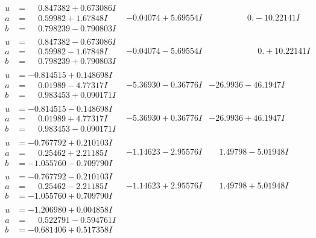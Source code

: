 \documentclass[1p]{elsarticle_modified}
\theoremstyle{definition}
\begin{document}
$$\begin{array}{c|c|c}
\begin{aligned}
u &= \phantom{-}0.847382 + 0.673086 I \\
a &= \phantom{-}0.59982 + 1.67848 I \\
b &= \phantom{-}0.798239 - 0.790803 I\end{aligned}
 & -0.04074 + 5.69554 I & \phantom{-0.000000 } 0. - 10.22141 I \\ \hline\begin{aligned}
u &= \phantom{-}0.847382 - 0.673086 I \\
a &= \phantom{-}0.59982 - 1.67848 I \\
b &= \phantom{-}0.798239 + 0.790803 I\end{aligned}
 & -0.04074 - 5.69554 I & \phantom{-0.000000 -}0. + 10.22141 I \\ \hline\begin{aligned}
u &= -0.814515 + 0.148698 I \\
a &= \phantom{-}0.01989 - 4.77317 I \\
b &= \phantom{-}0.983453 + 0.090171 I\end{aligned}
 & -5.36930 - 0.36776 I & -26.9936 - 46.1947 I \\ \hline\begin{aligned}
u &= -0.814515 - 0.148698 I \\
a &= \phantom{-}0.01989 + 4.77317 I \\
b &= \phantom{-}0.983453 - 0.090171 I\end{aligned}
 & -5.36930 + 0.36776 I & -26.9936 + 46.1947 I \\ \hline\begin{aligned}
u &= -0.767792 + 0.210103 I \\
a &= \phantom{-}0.25462 + 2.21185 I \\
b &= -1.055760 - 0.709790 I\end{aligned}
 & -1.14623 - 2.95576 I & \phantom{-}1.49798 - 5.01948 I \\ \hline\begin{aligned}
u &= -0.767792 - 0.210103 I \\
a &= \phantom{-}0.25462 - 2.21185 I \\
b &= -1.055760 + 0.709790 I\end{aligned}
 & -1.14623 + 2.95576 I & \phantom{-}1.49798 + 5.01948 I \\ \hline\begin{aligned}
u &= -1.206980 + 0.004858 I \\
a &= \phantom{-}0.522791 - 0.594761 I \\
b &= -0.681406 + 0.517358 I\end{aligned}

\end{array}$$
\end{document}
